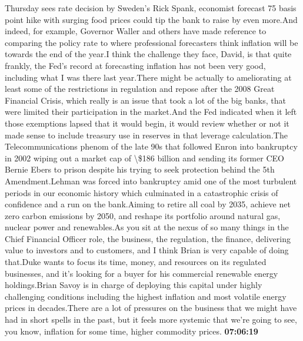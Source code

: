 \documentclass{article}%
\begin{document}
Thursday sees rate decision by Sweden's Rick Spank, economist forecast 75 basis point hike with surging food prices could tip the bank to raise by even more.And indeed, for example, Governor Waller and others have made reference to comparing the policy rate to where professional forecasters think inflation will be towards the end of the year.I think the challenge they face, David, is that quite frankly, the Fed's record at forecasting inflation has not been very good, including what I was there last year.There might be actually to ameliorating at least some of the restrictions in regulation and repose after the 2008 Great Financial Crisis, which really is an issue that took a lot of the big banks, that were limited their participation in the market.And the Fed indicated when it left those exemptions lapsed that it would begin, it would review whether or not it made sense to include treasury use in reserves in that leverage calculation.The Telecommunications phenom of the late 90s that followed Enron into bankruptcy in 2002 wiping out a market cap of \textbackslash{}\$186 billion and sending its former CEO Bernie Ebers to prison despite his trying to seek protection behind the 5th Amendment.Lehman was forced into bankruptcy amid one of the most turbulent periods in our economic history which culminated in a catastrophic crisis of confidence and a run on the bank.Aiming to retire all coal by 2035, achieve net zero carbon emissions by 2050, and reshape its portfolio around natural gas, nuclear power and renewables.As you sit at the nexus of so many things in the Chief Financial Officer role, the business, the regulation, the finance, delivering value to investors and to customers, and I think Brian is very capable of doing that.Duke wants to focus its time, money, and resources on its regulated businesses, and it's looking for a buyer for his commercial renewable energy holdings.Brian Savoy is in charge of deploying this capital under highly challenging conditions including the highest inflation and most volatile energy prices in decades.There are a lot of pressures on the business that we might have had in short spells in the past, but it feels more systemic that we're going to see, you know, inflation for some time, higher commodity prices.%
\textbf{07:06:19}%
\newline%
\end{document}
